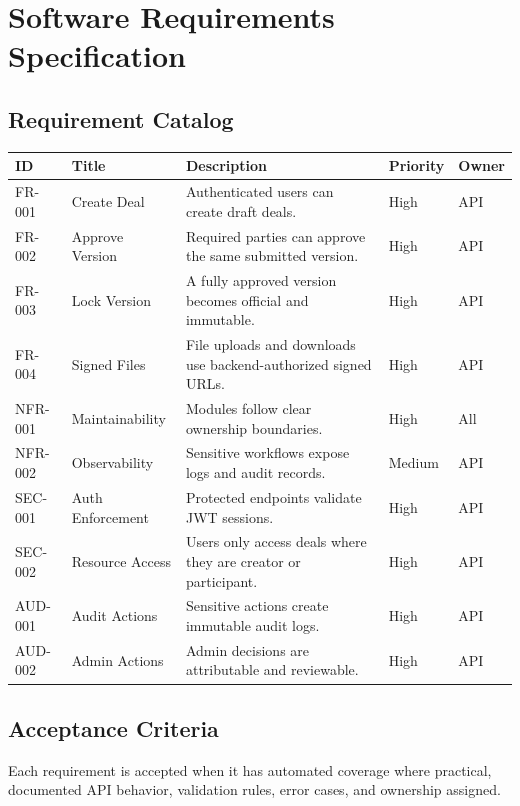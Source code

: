 \chapter{Software Requirements Specification}
\section{Requirement Catalog}
\begin{longtable}{p{}p{}p{}p{}p{}}
\toprule
ID & Title & Description & Priority & Owner \\
\midrule
FR-001 & Create Deal & Authenticated users can create draft deals. & High & API \\
FR-002 & Approve Version & Required parties can approve the same submitted version. & High & API \\
FR-003 & Lock Version & A fully approved version becomes official and immutable. & High & API \\
FR-004 & Signed Files & File uploads and downloads use backend-authorized signed URLs. & High & API \\
NFR-001 & Maintainability & Modules follow clear ownership boundaries. & High & All \\
NFR-002 & Observability & Sensitive workflows expose logs and audit records. & Medium & API \\
SEC-001 & Auth Enforcement & Protected endpoints validate JWT sessions. & High & API \\
SEC-002 & Resource Access & Users only access deals where they are creator or participant. & High & API \\
AUD-001 & Audit Actions & Sensitive actions create immutable audit logs. & High & API \\
AUD-002 & Admin Actions & Admin decisions are attributable and reviewable. & High & API \\
\bottomrule
\end{longtable}
\section{Acceptance Criteria}
Each requirement is accepted when it has automated coverage where practical, documented API behavior, validation rules, error cases, and ownership assigned.
